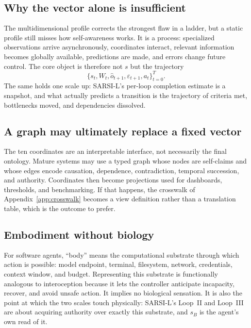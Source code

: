 \documentclass[11pt]{article}
\begin{document}
\subsection{Why the vector alone is insufficient}
The multidimensional profile corrects the strongest flaw in a ladder, but a static profile still misses how self-awareness works. It is a process: specialized observations arrive asynchronously, coordinates interact, relevant information becomes globally available, predictions are made, and errors change future control. The core object is therefore not $s$ but the trajectory
\begin{equation}
\{s_t, W_t, \hat{o}_{t+1}, \varepsilon_{t+1}, a_t\}_{t=0}^{T}.
\label{eq:trajectory}
\end{equation}
The same holds one scale up: SARSI-L's per-loop completion estimate is a snapshot, and what actually predicts a transition is the trajectory of criteria met, bottlenecks moved, and dependencies dissolved.

\subsection{A graph may ultimately replace a fixed vector}
The ten coordinates are an interpretable interface, not necessarily the final ontology. Mature systems may use a typed graph whose nodes are self-claims and whose edges encode causation, dependence, contradiction, temporal succession, and authority. Coordinates then become projections used for dashboards, thresholds, and benchmarking. If that happens, the crosswalk of Appendix~\ref{app:crosswalk} becomes a view definition rather than a translation table, which is the outcome to prefer.

\subsection{Embodiment without biology}
For software agents, ``body'' means the computational substrate through which action is possible: model endpoint, terminal, filesystem, network, credentials, context window, and budget. Representing this substrate is functionally analogous to interoception because it lets the controller anticipate incapacity, recover, and avoid unsafe action. It implies no biological sensation. It is also the point at which the two scales touch physically: SARSI-L's Loop~II and Loop~III are about acquiring authority over exactly this substrate, and $s_B$ is the agent's own read of it.
\end{document}
